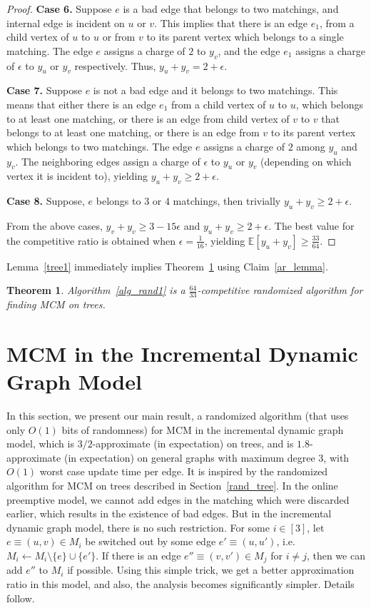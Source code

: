 \documentclass[11pt]{article}
\newtheorem{theorem}{Theorem}
\begin{document}
\begin{proof}
  \textbf{Case 6.} Suppose $e$ is a bad edge that belongs to two matchings, and internal edge is incident on $u$ or $v$.
	  This implies that there is an edge $e_1$, from a child vertex of $u$ to $u$ or from $v$ to its parent vertex which belongs to a single matching. The edge $e$ assigns a charge of $2$ to $y_v$, and the edge $e_1$  assigns a charge of $\epsilon$ to $y_u$ or $y_v$ respectively. Thus, $y_u+y_v=2+\epsilon$. 
  
  \textbf{Case 7.} Suppose $e$ is not a bad edge and it belongs to two matchings. This means that  either there is an edge $e_1$ from a child vertex of $u$ to $u$, which belongs to at least one matching,  or there is an edge from child vertex of $v$ to $v$ that belongs to at least one matching, or there is an edge from $v$ to its parent vertex which belongs to two matchings. The edge $e$ assigns a charge of  $2$ among $y_u$ and $y_v$. The neighboring edges assign a charge of $\epsilon$ to $y_u$ or $y_v$ (depending on which vertex it is incident to), yielding  $y_u+y_v\geq 2+\epsilon$.
	  
  \textbf{Case 8.} Suppose, $e$ belongs to $3$ or $4$ matchings, then trivially $y_u+y_v\geq 2+\epsilon$.
  
  From the above cases, $y_v+y_v\geq 3-15\epsilon$ and $y_u+y_v\geq 2+\epsilon$. The best value for the competitive ratio is obtained when $\epsilon=\frac{1}{16}$, yielding $\mathbb{E}[y_u+y_v]\geq \frac{33}{64}$.
\end{proof}
Lemma~\ref{tree1} immediately implies Theorem~\ref{ub_MCM} using Claim~\ref{ar_lemma}.
\begin{theorem}\label{ub_MCM}
 Algorithm~\ref{alg_rand1} is a $\frac{64}{33}$-competitive randomized algorithm for finding MCM on trees.
\end{theorem}


\section{MCM in the Incremental Dynamic Graph Model}\label{det_tree}
In this section, we present our main result, a randomized algorithm (that uses only $O(1)$ bits of randomness) for MCM in the incremental dynamic graph model, which is $3/2$-approximate (in expectation) on trees, and is $1.8$-approximate (in expectation) on general graphs with maximum degree $3$, with $O(1)$ worst case update time per edge. It is inspired by the randomized algorithm for MCM on trees described in Section~\ref{rand_tree}. In the online preemptive model, we cannot add edges in the matching which were discarded earlier, which results in the existence of bad edges. But in the incremental dynamic graph model, there is no such restriction. For some $i\in [3]$, let $e\equiv (u,v) \in M_i$ be switched out by some edge $e'\equiv (u,u')$, i.e. $M_i\gets  M_i\setminus \{e\}\cup\{e'\}$. If there is an edge $e''\equiv (v,v')\in M_j$ for $i\neq j$, then we can add $e''$ to $M_i$ if possible. Using this simple trick, we get a better approximation ratio in this model, and also, the analysis  becomes significantly simpler. Details follow.
\end{document}
